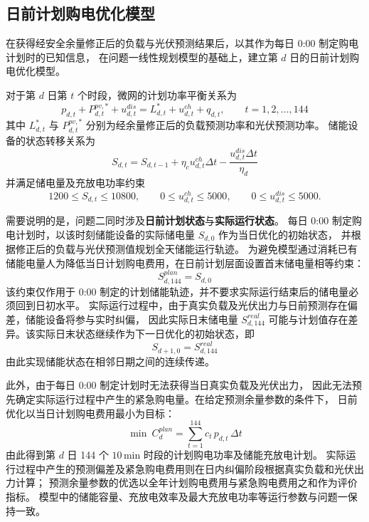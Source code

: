 \subsection{日前计划购电优化模型}
在获得经安全余量修正后的负载与光伏预测结果后，以其作为每日 0:00 制定购电计划时的已知信息，
在问题一线性规划模型的基础上，建立第 $d$ 日的日前计划购电优化模型。

对于第 $d$ 日第 $t$ 个时段，微网的计划功率平衡关系为
\begin{equation}
p_{d,t}+P^{pv,*}_{d,t}+u^{dis}_{d,t}=L^{*}_{d,t}+u^{ch}_{d,t}+q_{d,t},\qquad t=1,2,\dots,144
\end{equation}
其中 $L^{*}_{d,t}$ 与 $P^{pv,*}_{d,t}$ 分别为经余量修正后的负载预测功率和光伏预测功率。
储能设备的状态转移关系为
\begin{equation}
S_{d,t}=S_{d,t-1}+\eta_c u^{ch}_{d,t}\Delta t-\frac{u^{dis}_{d,t}\Delta t}{\eta_d}
\end{equation}
并满足储电量及充放电功率约束
\begin{equation}
1200\le S_{d,t}\le 10800,\qquad 0\le u^{ch}_{d,t}\le 5000,\qquad 0\le u^{dis}_{d,t}\le 5000 .
\end{equation}

需要说明的是，问题二同时涉及\textbf{日前计划状态}与\textbf{实际运行状态}。
每日 0:00 制定购电计划时，以该时刻储能设备的实际储电量 $S_{d,0}$ 作为当日优化的初始状态，
并根据修正后的负载与光伏预测值规划全天储能运行轨迹。
为避免模型通过消耗已有储能电量人为降低当日计划购电费用，在日前计划层面设置首末储电量相等约束：
\begin{equation}
S^{plan}_{d,144}=S_{d,0}
\end{equation}
该约束仅作用于 0:00 制定的计划储能轨迹，并不要求实际运行结束后的储电量必须回到日初水平。
实际运行过程中，由于真实负载及光伏出力与日前预测存在偏差，储能设备将参与实时纠偏，
因此实际日末储电量 $S^{real}_{d,144}$ 可能与计划值存在差异。该实际日末状态继续作为下一日优化的初始状态，即
\begin{equation}
S_{d+1,0}=S^{real}_{d,144}
\end{equation}
由此实现储能状态在相邻日期之间的连续传递。

此外，由于每日 0:00 制定计划时无法获得当日真实负载及光伏出力，
因此无法预先确定实际运行过程中产生的紧急购电量。在给定预测余量参数的条件下，
日前优化以当日计划购电费用最小为目标：
\begin{equation}
\min\ C^{plan}_{d}=\sum_{t=1}^{144} c_t\,p_{d,t}\,\Delta t
\end{equation}
由此得到第 $d$ 日 144 个 $10\,$min 时段的计划购电功率及储能充放电计划。
实际运行过程中产生的预测偏差及紧急购电费用则在日内纠偏阶段根据真实负载和光伏出力计算；
预测余量参数的优选以全年计划购电费用与紧急购电费用之和作为评价指标。
模型中的储能容量、充放电效率及最大充放电功率等运行参数与问题一保持一致。

